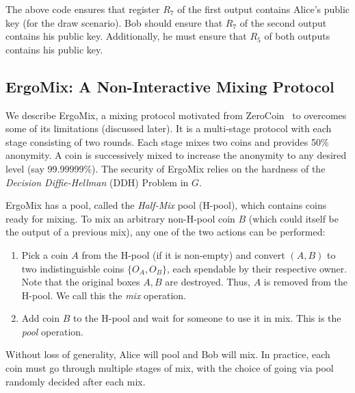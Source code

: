 \documentclass[11pt]{article}
\newcommand{\mixname}{ErgoMix\xspace}
\begin{document}

The above code ensures that register $R_7$ of the first output contains Alice's public key (for the draw scenario). Bob should ensure that $R_7$ of the second output contains his public key. Additionally, he must ensure that $R_5$ of both outputs contains his public key.

\subsection{\mixname: A Non-Interactive Mixing Protocol}
\label{mix}

We describe \mixname, a mixing protocol motivated from ZeroCoin~\cite{zerocoin} to overcomes some of its limitations (discussed later). It is a multi-stage protocol with each stage consisting of two rounds. Each stage mixes two coins and provides 50\% anonymity. A coin is successively mixed to increase the anonymity to any desired level (say 99.99999\%). The security of \mixname relies on the hardness of the {\em Decision Diffie-Hellman} (DDH) Problem in $G$. 

\mixname has a pool, called the {\em Half-Mix} pool (H-pool), which contains coins ready for mixing. 
To mix an arbitrary non-H-pool coin $B$ (which could itself be the output of a previous mix), any one of the two actions can be performed:
\begin{enumerate}
	\item Pick a coin $A$ from the H-pool (if it is non-empty) and convert $(A, B)$ to two indistinguisble coins $\{O_A, O_B\}$, each spendable by their respective owner. Note that the original boxes $A, B$ are destroyed. Thus, $A$ is removed from the H-pool. We call this the {\em mix} operation. 
	\item Add coin $B$ to the H-pool and wait for someone to use it in mix. This is the {\em pool} operation.
\end{enumerate}

 Without loss of generality, Alice will pool and Bob will mix. In practice, each coin must go through multiple stages of mix, with the choice of going via pool randomly decided after each mix.
\end{document}

